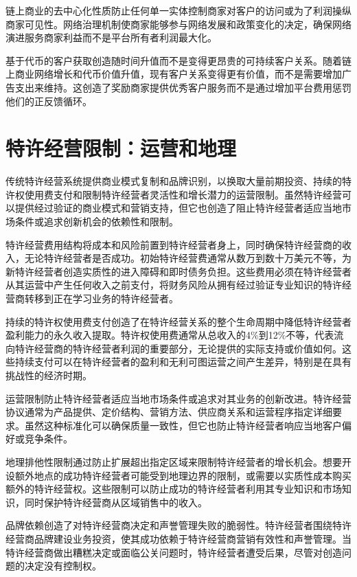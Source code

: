 \documentclass[
  Letterpaper,
]{scrbook}
\begin{document}
链上商业的去中心化性质防止任何单一实体控制商家对客户的访问或为了利润操纵商家可见性。网络治理机制使商家能够参与网络发展和政策变化的决定，确保网络演进服务商家利益而不是平台所有者利润最大化。

基于代币的客户获取创造随时间升值而不是变得更昂贵的可持续客户关系。随着链上商业网络增长和代币价值升值，现有客户关系变得更有价值，而不是需要增加广告支出来维持。这创造了奖励商家提供优秀客户服务而不是通过增加平台费用惩罚他们的正反馈循环。

\section{特许经营限制：运营和地理}\label{ux7279ux8bb8ux7ecfux8425ux9650ux5236ux8fd0ux8425ux548cux5730ux7406}

传统特许经营系统提供商业模式复制和品牌识别，以换取大量前期投资、持续的特许权使用费支付和限制特许经营者灵活性和增长潜力的运营限制。虽然特许经营可以提供经过验证的商业模式和营销支持，但它也创造了阻止特许经营者适应当地市场条件或追求创新机会的依赖性和限制。

特许经营费用结构将成本和风险前置到特许经营者身上，同时确保特许经营商的收入，无论特许经营者是否成功。初始特许经营费通常从数万到数十万美元不等，为新特许经营者创造实质性的进入障碍和即时债务负担。这些费用必须在特许经营者从其运营中产生任何收入之前支付，将财务风险从拥有经过验证专业知识的特许经营商转移到正在学习业务的特许经营者。

持续的特许权使用费支付创造了在特许经营关系的整个生命周期中降低特许经营者盈利能力的永久收入提取。特许权使用费通常从总收入的4\%到12\%不等，代表流向特许经营商的特许经营者利润的重要部分，无论提供的实际支持或价值如何。这些持续支付可以在特许经营者的盈利和无利可图运营之间产生差异，特别是在具有挑战性的经济时期。

运营限制防止特许经营者适应当地市场条件或追求对其业务的创新改进。特许经营协议通常为产品提供、定价结构、营销方法、供应商关系和运营程序指定详细要求。虽然这种标准化可以确保质量一致性，但它也防止特许经营者响应当地客户偏好或竞争条件。

地理排他性限制通过防止扩展超出指定区域来限制特许经营者的增长机会。想要开设额外地点的成功特许经营者可能受到地理边界的限制，或需要以实质性成本购买额外的特许经营权。这些限制可以防止成功的特许经营者利用其专业知识和市场知识，同时保护特许经营商从区域销售中的收入。

品牌依赖创造了对特许经营商决定和声誉管理失败的脆弱性。特许经营者围绕特许经营商品牌建设业务投资，使其成功依赖于特许经营商营销有效性和声誉管理。当特许经营商做出糟糕决定或面临公关问题时，特许经营者遭受后果，尽管对创造问题的决定没有控制权。
\end{document}
